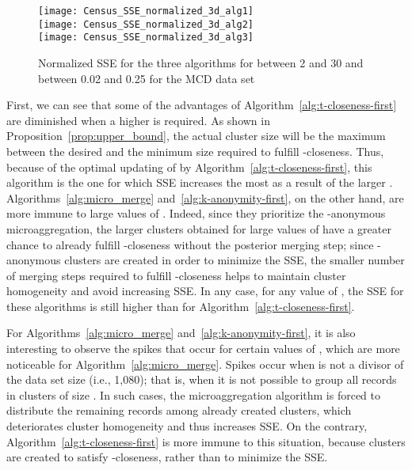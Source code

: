 \documentclass[10pt,journal,compsoc]{IEEEtran}
\theoremstyle{definition}
\theoremstyle{plain}
\begin{document}
\begin{figure}[!t]
\begin{centering}
	\texttt{[image: Census\_SSE\_normalized\_3d\_alg1]}\\
	\vspace{0.4cm}	
\texttt{[image: Census\_SSE\_normalized\_3d\_alg2]}\\
	\vspace{0.4cm}
	\texttt{[image: Census\_SSE\_normalized\_3d\_alg3]}\\
	\vspace{0.4cm}
\par\end{centering}
\protect\caption{Normalized SSE for the three algorithms 
for  between 2 and 30 
and  between 0.02 and 0.25 for the MCD data set\label{fig:SSE-3D}}
	\end{figure}

First, we can see that some of the advantages of Algorithm~\ref{alg:t-closeness-first}
are diminished when a higher  is required. As shown in 
Proposition~\ref{prop:upper_bound}, the actual cluster size will be
the maximum between the desired  and the minimum size
required to fulfill -closeness. Thus, because of the optimal
updating of  by Algorithm~\ref{alg:t-closeness-first},
this algorithm is the one for which SSE increases the most as a 
result of the larger .
Algorithms~\ref{alg:micro_merge} and~\ref{alg:k-anonymity-first},
on the other hand, are more immune to large values of .
Indeed, since they prioritize the -anonymous microaggregation,
the larger clusters obtained for large values of 
have a greater chance to already fulfill -closeness
without the posterior merging step;
since -anonymous clusters are created in order to 
minimize the SSE, the smaller number of merging steps required 
to fulfill -closeness helps to maintain cluster homogeneity 
and avoid increasing SSE. In any case, for any value of , the 
SSE for these 
algorithms is still higher than for Algorithm~\ref{alg:t-closeness-first}.

For Algorithms~\ref{alg:micro_merge} and~\ref{alg:k-anonymity-first},
it is also interesting to observe the
spikes that occur for certain values of ,
which are more noticeable for Algorithm~\ref{alg:micro_merge}.
Spikes occur when  is not a divisor of the data set size  (i.e., 1,080);
that is, when it is not possible to group all records in clusters
of size .
In such cases, the microaggregation algorithm is forced to distribute
the remaining  records among already created clusters,
which deteriorates cluster homogeneity and thus increases SSE.
On the contrary, Algorithm~\ref{alg:t-closeness-first} is more immune to this situation,
because clusters are created to satisfy -closeness, rather than
to minimize the SSE.
\end{document}
